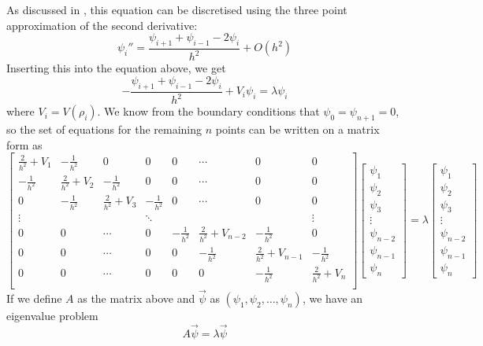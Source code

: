 \documentclass[12pt,english,a4paper]{report}
\begin{document}
As discussed in \autocite{oblig1}, this equation can be discretised using the three point approximation of the second derivative:
\[
\psi_i'' = \frac{\psi_{i+1} + \psi_{i-1} - 2\psi_i}{h^2} + O(h^2)
\]
Inserting this into the equation above, we get
\[
-\frac{\psi_{i+1} + \psi_{i-1} - 2\psi_i}{h^2} + V_i\psi_i = \lambda\psi_i
\]
where \(V_i=V(\rho_i)\). We know from the boundary conditions that \(\psi_0=\psi_{n+1}=0\), so the set of equations for the remaining \(n\) points can be written on a matrix form as
\[
\begin{bmatrix}
\frac{2}{h^2} + V_1 & -\frac{1}{h^2} & 0 & 0 & 0 & \cdots & 0 & 0\\
-\frac{1}{h^2} & \frac{2}{h^2} + V_2 & -\frac{1}{h^2} & 0 & 0 & \cdots & 0 & 0\\
0 & -\frac{1}{h^2} & \frac{2}{h^2} + V_3 & -\frac{1}{h^2} & 0 & \cdots & 0 & 0\\
\vdots & & & \ddots & & & & \vdots\\
0 & 0 & \cdots & 0 & -\frac{1}{h^2} & \frac{2}{h^2} + V_{n-2} & -\frac{1}{h^2} & 0\\
0 & 0 & \cdots & 0 & 0 & -\frac{1}{h^2} & \frac{2}{h^2} + V_{n-1} & -\frac{1}{h^2}\\
0 & 0 & \cdots & 0 & 0 & 0 & -\frac{1}{h^2} & \frac{2}{h^2} + V_{n}\\
\end{bmatrix}
\begin{bmatrix}
\psi_1\\
\psi_2\\
\psi_3\\
\vdots\\
\psi_{n-2}\\
\psi_{n-1}\\
\psi_n
\end{bmatrix}
=
\lambda
\begin{bmatrix}
\psi_1\\
\psi_2\\
\psi_3\\
\vdots\\
\psi_{n-2}\\
\psi_{n-1}\\
\psi_n
\end{bmatrix}
\]
If we define \(A\) as the matrix above and \(\vec{\psi}\) as \((\psi_1,\psi_2,\dots,\psi_n)\), we have an eigenvalue problem
\[
A\vec{\psi}=\lambda\vec{\psi}
\]

\end{document}
